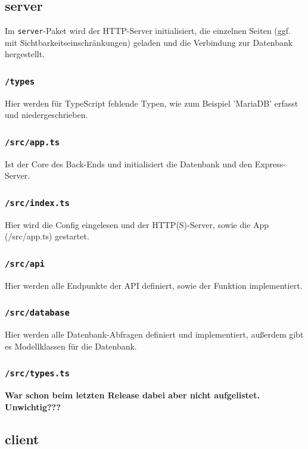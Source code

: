\documentclass[11pt,a4paper]{report}
\begin{document}
	\subsection{server}
	Im \texttt{server}-Paket wird der HTTP-Server initialisiert, die einzelnen Seiten (ggf. mit Sichtbarkeitseinschränkungen) geladen und die Verbindung zur Datenbank hergestellt.
	
	\subsubsection*{\texttt{/types}}
	Hier werden für TypeScript fehlende Typen, wie zum Beispiel 'MariaDB' erfasst und niedergeschrieben.
	
	\subsubsection*{\texttt{/src/app.ts}}
	Ist der Core des Back-Ends und initialisiert die Datenbank und den Express-Server.
	
	\subsubsection*{\texttt{/src/index.ts}}
	Hier wird die Config eingelesen und der HTTP(S)-Server, sowie die App (/src/app.ts) gestartet.

	\subsubsection*{\texttt{/src/api}}
	Hier werden alle Endpunkte der API definiert, sowie der Funktion implementiert.
	
	\subsubsection*{\texttt{/src/database}}
	Hier werden alle Datenbank-Abfragen definiert und implementiert, außerdem gibt es Modellklassen für die Datenbank.
	
	\subsubsection*{\texttt{/src/types.ts}}
	\textbf{War schon beim letzten Release dabei aber nicht aufgelistet. Unwichtig???}
	
	
	\subsection{client}
	
\end{document}
